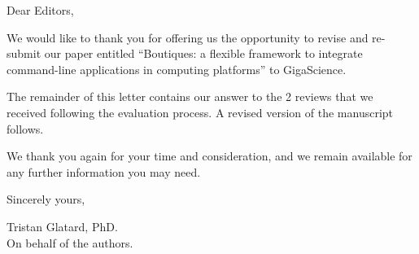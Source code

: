\documentclass[a4]{letter}
\date{January 26th, 2018}
\begin{document}
\begin{letter}{}

\opening{Dear Editors,}

We would like to thank you for offering us the opportunity to revise
and re-submit our paper entitled ``Boutiques: a flexible framework to integrate
command-line applications in computing platforms'' to GigaScience.

The remainder of this letter contains our answer to the 2 reviews that
we received following the evaluation process. A revised version of the
manuscript follows.

We thank you again for your time and consideration, and we remain
available for any further information you may need.

\vspace{0.5cm}

Sincerely yours,

\vspace{1cm}

\closing{Tristan Glatard, PhD.\\On behalf of the authors.}

\end{letter}
\end{document}

